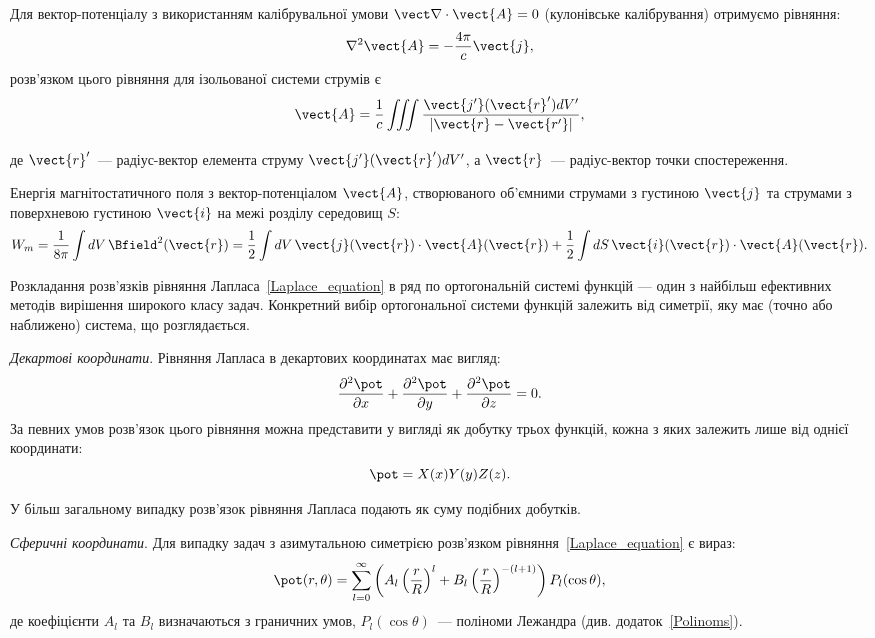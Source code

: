 \begin{Theory}
	Для вектор-потенціалу з використанням калібрувальної умови $\vect\nabla\cdot\vect{A} = 0$ (кулонівське калібрування) отримуємо рівняння:
	\begin{equation}
		\nabla^2\vect{A} = - \frac{4\pi}{c}\vect{j},
	\end{equation}
    розв'язком цього рівняння для ізольованої системи струмів є
	\begin{equation}
		\vect{A} = \frac1c \iiint\limits_{} \frac{\vect{j'}(\vect{r}') dV'}{\left| \vect{r} - \vect{r'} \right|},
	\end{equation}
	де $\vect{r}'$~--- радіус-вектор елемента струму $\vect{j'}(\vect{r}') dV'$, а $\vect{r}$~--- радіус-вектор точки спостереження.

Енергія магнітостатичного поля з вектор-потенціалом $\vect{A}$, створюваного об’ємними струмами з густиною $\vect{j}$ та струмами з поверхневою  густиною $\vect{i}$  на межі розділу середовищ $S$:  
\begin{equation}\label{eq:Wm}
    W_m = \frac{1}{{8\pi }}\int dV \,\Bfield^2(\vect{r}) = \frac{1}{2}\int dV \, \vect{j}(\vect{r}) \cdot \vect{A}(\vect{r}) + \frac{1}{2}\int {dS} \, \vect{i}(\vect{r}) \cdot \vect{A}(\vect{r}).
\end{equation}

    \bigskip

	Розкладання розв'язків рівняння Лапласа~\eqref{Laplace_equation} в ряд по ортогональній системі функцій --- один з найбільш ефективних методів вирішення широкого класу задач. Конкретний вибір ортогональної системи функцій залежить від симетрії, яку має (точно або наближено) система, що розглядається.

	\bigskip\textit{Декартові координати}. Рівняння Лапласа в декартових координатах має вигляд:
	\begin{equation}\label{eq:Laplase_eqn_Cartesian}
		\frac{\partial^2\pot}{\partial x} + \frac{\partial^2\pot}{\partial y} + \frac{\partial^2\pot}{\partial z} = 0.
	\end{equation}
	За певних умов розв'язок цього рівняння можна представити у вигляді як добутку трьох функцій, кожна з яких залежить лише від однієї координати:
	\begin{equation*}
		\pot = X(x)Y(y)Z(z).
	\end{equation*}

	У більш загальному випадку розв'язок рівняння Лапласа подають як суму подібних добутків.


	\bigskip\textit{Сферичні координати}. Для випадку задач з азимутальною симетрією розв'язком рівняння~\eqref{Laplace_equation} є вираз:
	\begin{equation}\label{eq:Laplase_Azimuthal}
		\pot(r, \theta) =  \sum\limits_{l = 0}^{\infty} \left(A_l \left( \frac{r}{R}\right)^l + B_l \left( \frac{r}{R}\right)^{-(l+1)} \right) P_l(\cos\theta) ,
	\end{equation}
	де коефіцієнти $A_l$ та $B_l$ визначаються з граничних умов, $P_l(\cos\theta)$~--- поліноми Лежандра (див. додаток~\ref{Polinoms}).


\end{Theory}
